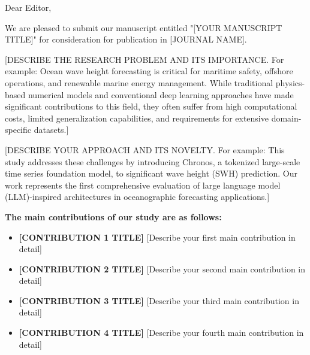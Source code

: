 \documentclass{article}
\begin{document}

Dear Editor,

\bigskip %


We are pleased to submit our manuscript entitled "[YOUR MANUSCRIPT TITLE]" for consideration for publication in [JOURNAL NAME].

[DESCRIBE THE RESEARCH PROBLEM AND ITS IMPORTANCE. For example: Ocean wave height forecasting is critical for maritime safety, offshore operations, and renewable marine energy management. While traditional physics-based numerical models and conventional deep learning approaches have made significant contributions to this field, they often suffer from high computational costs, limited generalization capabilities, and requirements for extensive domain-specific datasets.]

[DESCRIBE YOUR APPROACH AND ITS NOVELTY. For example: This study addresses these challenges by introducing Chronos, a tokenized large-scale time series foundation model, to significant wave height (SWH) prediction. Our work represents the first comprehensive evaluation of large language model (LLM)-inspired architectures in oceanographic forecasting applications.]

\bigskip

\textbf{The main contributions of our study are as follows:}
\begin{itemize}
    \item \textbf{[CONTRIBUTION 1 TITLE]} [Describe your first main contribution in detail]
    
    \item \textbf{[CONTRIBUTION 2 TITLE]} [Describe your second main contribution in detail]
    
    \item \textbf{[CONTRIBUTION 3 TITLE]} [Describe your third main contribution in detail]
    
    \item \textbf{[CONTRIBUTION 4 TITLE]} [Describe your fourth main contribution in detail]
    
\end{itemize}
\end{document}
